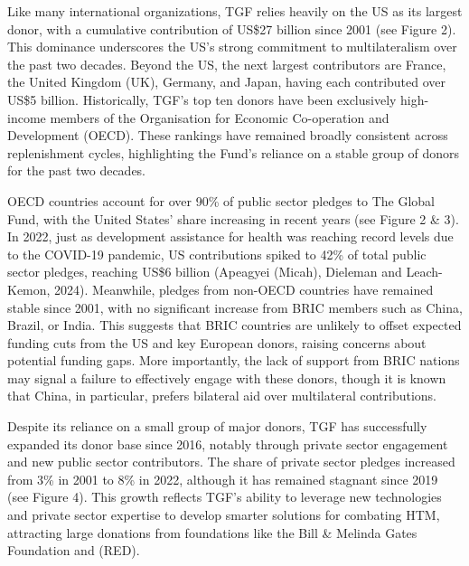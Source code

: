 \documentclass[
]{article}
\makeatletter
\newcommand*\pandocbounded[1]{%
  \sbox\pandoc@box{#1}%
  \Gscale@div\@tempa{\textheight}{\dimexpr\ht\pandoc@box+\dp\pandoc@box\relax}%
  \Gscale@div\@tempb{\linewidth}{\wd\pandoc@box}%
  \ifdim\@tempb\p@<\@tempa\p@\let\@tempa\@tempb\fi%
  \ifdim\@tempa\p@<\p@\scalebox{\@tempa}{\usebox\pandoc@box}%
  \else\usebox{\pandoc@box}%
  \fi%
}
\makeatother
\begin{document}
Like many international organizations, TGF relies heavily on the US as
its largest donor, with a cumulative contribution of US\$27 billion
since 2001 (see Figure 2). This dominance underscores the US's strong
commitment to multilateralism over the past two decades. Beyond the US,
the next largest contributors are France, the United Kingdom (UK),
Germany, and Japan, having each contributed over US\$5 billion.
Historically, TGF's top ten donors have been exclusively high-income
members of the Organisation for Economic Co-operation and Development
(OECD). These rankings have remained broadly consistent across
replenishment cycles, highlighting the Fund's reliance on a stable group
of donors for the past two decades.

OECD countries account for over 90\% of public sector pledges to The
Global Fund, with the United States' share increasing in recent years
(see Figure 2 \& 3). In 2022, just as development assistance for health
was reaching record levels due to the COVID-19 pandemic, US
contributions spiked to 42\% of total public sector pledges, reaching
US\$6 billion (Apeagyei (Micah), Dieleman and Leach-Kemon, 2024).
Meanwhile, pledges from non-OECD countries have remained stable since
2001, with no significant increase from BRIC members such as China,
Brazil, or India. This suggests that BRIC countries are unlikely to
offset expected funding cuts from the US and key European donors,
raising concerns about potential funding gaps. More importantly, the
lack of support from BRIC nations may signal a failure to effectively
engage with these donors, though it is known that China, in particular,
prefers bilateral aid over multilateral contributions.

Despite its reliance on a small group of major donors, TGF has
successfully expanded its donor base since 2016, notably through private
sector engagement and new public sector contributors. The share of
private sector pledges increased from 3\% in 2001 to 8\% in 2022,
although it has remained stagnant since 2019 (see Figure 4). This growth
reflects TGF's ability to leverage new technologies and private sector
expertise to develop smarter solutions for combating HTM, attracting
large donations from foundations like the Bill \& Melinda Gates
Foundation and (RED).

\pandocbounded{\texttt{[image: README\_files/figure-latex/plot 1 \& 2-1.pdf]}}
\end{document}
